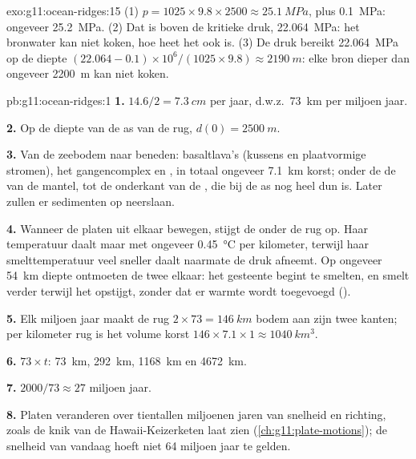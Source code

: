 \begin{solution}{exo:g11:ocean-ridges:15}
(1) $p = 1025 \times 9.8 \times 2500 \approx \qty{25.1}{MPa}$, plus
\qty{0.1}{MPa}: ongeveer \qty{25.2}{MPa}. (2) Dat is boven de kritieke
druk, \qty{22.064}{MPa}: het bronwater kan niet koken, hoe heet het ook is.
(3) De druk bereikt \qty{22.064}{MPa} op de diepte
$(22.064 - 0.1) \times 10^6/(1025 \times 9.8) \approx \qty{2190}{m}$: elke
bron dieper dan ongeveer \qty{2200}{m} kan niet koken.
\end{solution}

\begin{solution}{pb:g11:ocean-ridges:1}
\textbf{1.} $14.6/2 = \qty{7.3}{cm}$ per jaar, d.w.z.\ \qty{73}{km} per miljoen
jaar.

\textbf{2.} Op de diepte van de as van de rug, $d(0) = \qty{2500}{m}$.

\textbf{3.} Van de zeebodem naar beneden: basaltlava's (kussens en plaatvormige stromen),
het gangencomplex en , in totaal ongeveer \qty{7.1}{km} korst; onder de
 de  van de mantel, tot de onderkant van de , die bij de as
nog heel dun is. Later zullen er sedimenten op neerslaan.

\textbf{4.} Wanneer de platen uit elkaar bewegen, stijgt de  onder de
rug op. Haar temperatuur daalt maar met ongeveer \qty{0.45}{\celsius} per
kilometer, terwijl haar smelttemperatuur veel sneller daalt naarmate de druk
afneemt. Op ongeveer \qty{54}{km} diepte ontmoeten de twee elkaar: het gesteente begint
te smelten, en smelt verder terwijl het opstijgt, zonder dat er warmte wordt
toegevoegd ().

\textbf{5.} Elk miljoen jaar maakt de rug $2 \times 73 = \qty{146}{km}$
bodem aan zijn twee kanten; per kilometer rug is het volume korst
$146 \times 7.1 \times 1 \approx \qty{1040}{km^3}$.

\textbf{6.} $73 \times t$: \qty{73}{km}, \qty{292}{km}, \qty{1168}{km} en
\qty{4672}{km}.

\textbf{7.} $2000/73 \approx 27$ miljoen jaar.

\textbf{8.} Platen veranderen over tientallen miljoenen jaren van snelheid en
richting, zoals de knik van de Hawaii-Keizerketen laat zien
(\cref{ch:g11:plate-motions}); de snelheid van vandaag hoeft niet 64
miljoen jaar te gelden.


\end{solution}
